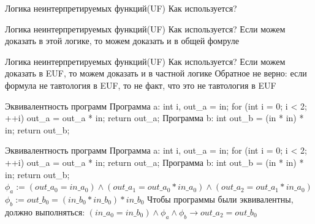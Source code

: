 \documentclass{beamer}
\begin{document}
\begin{frame}{Логика неинтерпретируемых функций(UF)}
Как используется?\newline
\end{frame}

\begin{frame}{Логика неинтерпретируемых функций(UF)}
Как используется?\newline
Если можем доказать в этой логике, то можем доказать и в общей фомруле
\end{frame}

\begin{frame}{Логика неинтерпретируемых функций(UF)}
Как используется?\newline
Если можем доказать в EUF, то можем доказать и в частной логике\newline
Обратное не верно: если формула не тавтология в EUF, то не факт, что это не тавтология в EUF
\end{frame}

\begin{frame}{Эквивалентность программ}
Программа a:\newline
int i, out\_a = in;\newline
for (int i = 0; i < 2; ++i) out\_a = out\_a * in;\newline
return out\_a;\newline
Программа b:\newline
int out\_b = (in * in) * in;\newline
return out\_b;\newline
\end{frame}

\begin{frame}{Эквивалентность программ}
Программа a:\newline
int i, out\_a = in;\newline
for (int i = 0; i < 2; ++i) out\_a = out\_a * in;\newline
return out\_a;\newline
Программа b:\newline
int out\_b = (in * in) * in;\newline
return out\_b;\newline
$\phi_a := (out\_a_0 = in\_a_0) \wedge (out\_a_1 = out\_a_0 * in\_a_0) \wedge (out\_a_2 = out\_a_1 * in\_a_0)$\newline
$\phi_b := out\_b_0 = (in\_b_0 * in\_b_0) * in\_b_0$\newline
Чтобы программы были эквивалентны, должно выполняться:\newline
$(in\_a_0 = in\_b_0) \wedge \phi_a \wedge \phi_b \rightarrow out\_a_2 = out\_b_0$
\end{frame}
\end{document}
